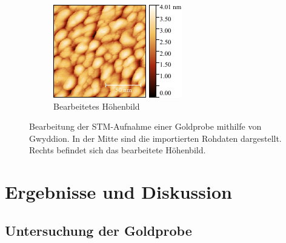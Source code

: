 \documentclass[a4paper,twoside,final]{article}
\begin{document}
\begin{figure}[htp]
\begin{subfigure}{0.3\textwidth}
        \includegraphics[width=\textwidth]{Bilder/Image01963_bearbeitet.pdf}
        \caption{Bearbeitetes Höhenbild}
    \end{subfigure}
    \caption{Bearbeitung der STM-Aufnahme einer Goldprobe mithilfe von Gwyddion. In der Mitte sind die importierten Rohdaten dargestellt. Rechts befindet sich das bearbeitete Höhenbild.}
    \label{fig:Bildbearbeitung}
\end{figure}
\newpage
\section{Ergebnisse und Diskussion}\label{sec:ErgebnisseUndDiskussion}
\subsection{Untersuchung der Goldprobe}
\end{document}
